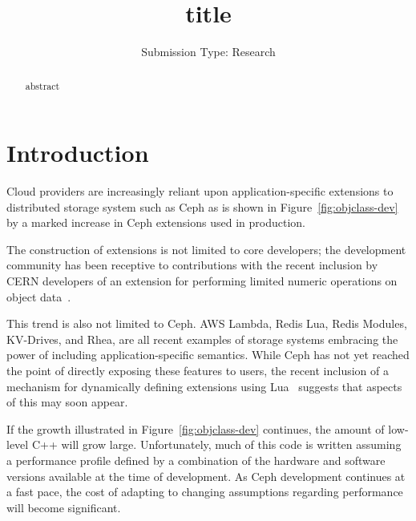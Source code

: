\documentclass[10pt,twocolumn]{article}
\begin{document}
\title{title}

\author{
\small Submission Type: Research
}

\date{}
\maketitle

\begin{abstract}
abstract
\end{abstract}

\section{Introduction}

Cloud providers are increasingly reliant upon application-specific extensions
to distributed storage system such as Ceph as is shown in
Figure~\ref{fig:objclass-dev} by a marked increase in Ceph extensions used in
production.

The construction of extensions is not limited to core developers; the
development community has been receptive to contributions with the recent
inclusion by CERN developers of an extension for performing limited numeric
operations on object data~\cite{cls_numops}.

This trend is also not limited to Ceph. AWS Lambda, Redis Lua, Redis Modules,
KV-Drives, and Rhea, are all recent examples of storage systems embracing the
power of including application-specific semantics. While Ceph has not yet
reached the point of directly exposing these features to users, the recent
inclusion of a mechanism for dynamically defining extensions using
Lua~\cite{cls_lua} suggests that aspects of this may soon appear.

If the growth illustrated in Figure~\ref{fig:objclass-dev} continues, the
amount of low-level C++ will grow large. Unfortunately, much of
this code is written assuming a performance profile defined by a combination
of the hardware and software versions available at the time of development. As
Ceph development continues at a fast pace, the cost of adapting to changing
assumptions regarding performance will become significant.

\end{document}
